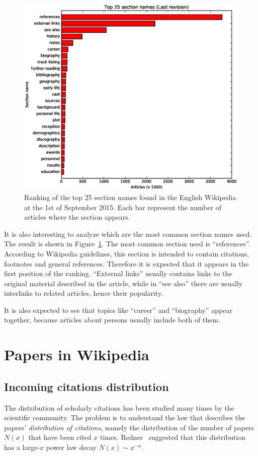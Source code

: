 \begin{figure}[h]
\centering
\includegraphics[keepaspectratio=true, width=\textwidth]{assets/section_names_last_top_25}
\caption{Ranking of the top 25 section names found in the English Wikipedia at the 1st of September 2015.
Each bar represent the number of articles where the section appears.}
\label{fig:section_names_last_top_25}
\end{figure}

It is also interesting to analyze which are the most common section names used.
The result is shown in Figure~\ref{fig:section_names_last_top_25}.
The most common section used is ``references''.
According to Wikipedia guidelines, this section is intended to contain citations, footnotes and general references.
Therefore it is expected that it appears in the first position of the ranking.
``External links'' usually contains links to the original material described in the article, while in ``see also'' there are usually interlinks to related articles, hence their popularity.

It is also expected to see that topics like ``career'' and ``biography'' appear together, because articles about persons usually include both of them.


\section{Papers in Wikipedia}
\subsection{Incoming citations distribution}
The distribution of scholarly citations has been studied many times by the scientific community.
The problem is to understand the law that describes the papers' \emph{distribution of citations}, namely the distribution of the number of papers $N(x)$ that have been cited $x$ times.
Redner~\cite{Redner1998} suggested that this distribution has a large-$x$ power law decay $N(x) \sim x^{-\alpha}$.

